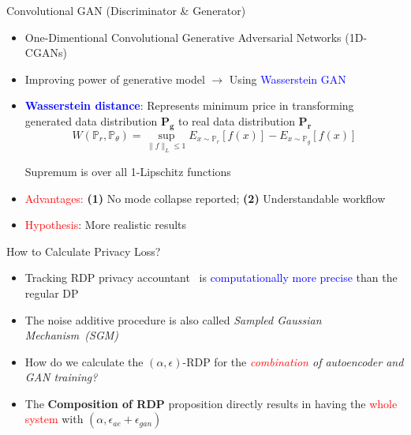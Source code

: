 \documentclass{beamer}
\begin{document}
\begin{frame}{Convolutional GAN (Discriminator \& Generator)}

\begin{itemize}
    \item One-Dimentional Convolutional Generative Adversarial Networks (1D-CGANs)
    
    \item Improving power of generative model $\rightarrow$ Using \textcolor{blue}{Wasserstein GAN}~\cite{arjovsky2017wasserstein}
    \item \textcolor{blue}{\textbf{Wasserstein distance}}: Represents minimum price in transforming generated data distribution $\boldsymbol{P_g}$ to real data distribution $\boldsymbol{P_r}$
    \begin{equation*} \label{eq:KR}
    W(\mathbb{P}_r, \mathbb{P}_\theta) = \sup_{\|f\|_L \leq 1} E_{x \sim \mathbb{P}_r}
    [f(x)] - E_{x \sim \mathbb{P}_g}[f(x)]
    \end{equation*}
    
    Supremum is over all 1-Lipschitz functions
    \item \textcolor{red}{Advantages:} \textbf{(1)} No mode collapse reported; \textbf{(2)} Understandable workflow
    \item \textcolor{red}{Hypothesis}: More realistic results
\end{itemize}

\end{frame}


\begin{frame}{How to Calculate Privacy Loss?}

\begin{itemize}
    \item Tracking RDP privacy accountant~\cite{abadi2016deep} is \textcolor{blue}{computationally more precise} than the regular DP
    \item The noise additive procedure is also called \textit{Sampled Gaussian Mechanism~(SGM)}
    \item How do we calculate the $(\alpha,\epsilon)$-RDP for the \textit{\textcolor{red}{combination} of autoencoder and GAN training?}
    \item The \textbf{Composition of RDP} proposition directly results in having the \textcolor{red}{whole system} with $(\alpha,\epsilon_{ae}+\epsilon_{gan})$
\end{itemize}



\end{frame}
\end{document}
